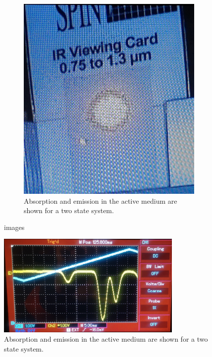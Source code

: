 \begin{figure}
\begin{subfigure}{0.49\textwidth}
        \includegraphics[width=\textwidth]{bilder/laser_after.jpg}
        \caption{Absorption and emission in the active medium are shown for a two state system. \cite{anleitungHeNe}}
        \label{fig:laser_after}
    \end{subfigure}
    \caption{images}
\end{figure}
\begin{figure}
    \center
    \includegraphics[width=0.8\textwidth]{bilder/spectrum.jpg}
    \caption{Absorption and emission in the active medium are shown for a two state system. \cite{anleitungHeNe}}
    \label{fig:spectrum}
\end{figure}